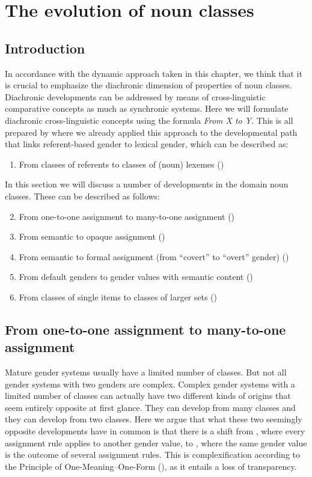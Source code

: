 \documentclass[output=collectionpaper]{langsci/langscibook}
\begin{document}
\section{The evolution of noun classes}
\label{sec:WDG:6}

  \subsection{Introduction}

In accordance with the dynamic approach taken in this chapter, we think that it is crucial to emphasize the diachronic dimension of properties of noun classes. Diachronic developments can be addressed by means of cross-linguistic comparative concepts as much as synchronic systems. Here we will formulate diachronic cross-linguistic concepts using the formula \textit{From X to Y}. This is all prepared by  where we already applied this approach to the developmental path that links referent-based gender to lexical gender, which can be described as:
\begin{enumerate}[label=(\roman*)]
\item	From classes of referents to classes of (noun) lexemes ()
\end{enumerate}
In this section we will discuss a number of developments in the domain noun classes. These can be described as follows:
\begin{enumerate}[label=(\roman*)]
  \setcounter{enumi}{1}
\item From one-to-one assignment to many-to-one assignment ()
\item From semantic to opaque assignment ()
\item	From semantic to formal assignment (from ``covert'' to ``overt'' gender) ()
\item From default genders to gender values with semantic content ()
\item From classes of single items to classes of larger sets ()
\end{enumerate}

  \subsection{From one-to-one assignment to many-to-one assignment}
\label{sec:WDG:6.2}

Mature gender systems usually have a limited number of classes. But not all gender systems with two genders are complex. Complex gender systems with a limited number of classes can actually have two different kinds of origins that seem entirely opposite at first glance. They can develop from many classes and they can develop from two classes. Here we argue that what these two seemingly opposite developments have in common is that there is a shift from , where every assignment rule applies to another gender value, to , where the same gender value is the outcome of several assignment rules. This is complexification according to the Principle of One-Meaning--One-Form (), as it entails a loss of transparency.
\end{document}

